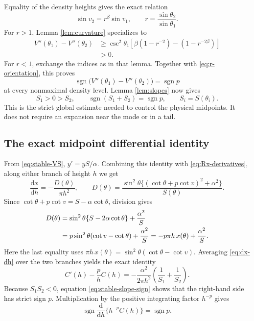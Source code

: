 \documentclass[11pt,a4paper]{article}
\theoremstyle{definition}
\theoremstyle{remark}
\numberwithin{equation}{section}
\newcommand{\sign}{\operatorname{sgn}}
\begin{document}
Equality of the density heights gives the exact relation
\begin{equation}\label{eq:equal-sines}
 \sin v_2=r^\beta\sin v_1,\qquad
 r=\frac{\sin\theta_2}{\sin\theta_1}.
\end{equation}
For $r>1$, Lemma \ref{lem:curvature} specializes to
\begin{equation}\label{eq:stable-gap}
 \begin{split}
 V''(\theta_1)-V''(\theta_2)
 &\ge\csc^2\theta_1
 \left[\beta(1-r^{-2})-(1-r^{-2\beta})\right]\\
 &>0 .
 \end{split}
\end{equation}
For $r<1$, exchange the indices as in that lemma. Together with
\eqref{eq:r-orientation}, this proves
\[
 \sign\bigl(V''(\theta_1)-V''(\theta_2)\bigr)=\sign p
\]
at every nonmaximal density level. Lemma \ref{lem:slopes} now gives
\begin{equation}\label{eq:stable-slope-sign}
 S_1>0>S_2,\qquad \sign(S_1+S_2)=\sign p,
 \qquad S_i=S(\theta_i).
\end{equation}
This is the strict global estimate needed to control the physical
midpoints. It does not require an expansion near the mode or in a tail.

\subsection{The exact midpoint differential identity}

From \eqref{eq:stable-VS},
$y'=yS/\alpha$. Combining this identity with
\eqref{eq:Rx-derivatives}, along either branch of height $h$ we get
\begin{equation}\label{eq:dx-dh}
 \frac{\mathrm dx}{\mathrm dh}
 =-\frac{D(\theta)}{\pi h^2},\qquad
 D(\theta)=
 \frac{\sin^2\theta\{(\cot\theta+p\cot v)^2+\alpha^2\}}{S(\theta)}.
\end{equation}
Since $\cot\theta+p\cot v=S-\alpha\cot\theta$, division gives
\begin{align}
 D(\theta)
 &=\sin^2\theta\{S-2\alpha\cot\theta\}
     +\frac{\alpha^2}{S}\notag\\
 &=p\sin^2\theta(\cot v-\cot\theta)+\frac{\alpha^2}{S}
  =-p\pi h\,x(\theta)+\frac{\alpha^2}{S}.
 \label{eq:D-identity}
\end{align}
Here the last equality uses
$\pi h\,x(\theta)=\sin^2\theta(\cot\theta-\cot v)$.
Averaging \eqref{eq:dx-dh} over the two branches yields the exact
identity
\begin{equation}\label{eq:midpoint-ode}
 \boxed{\quad
 C'(h)-\frac{p}{h}C(h)
 =-\frac{\alpha^2}{2\pi h^2}
       \left(\frac1{S_1}+\frac1{S_2}\right).
 \quad}
\end{equation}
Because $S_1S_2<0$, equation \eqref{eq:stable-slope-sign} shows that
the right-hand side has strict sign $p$. Multiplication by the positive
integrating factor $h^{-p}$ gives
\begin{equation}\label{eq:weighted-monotonicity}
 \sign\frac{\mathrm d}{\mathrm dh}\{h^{-p}C(h)\}=\sign p.
\end{equation}
\end{document}
